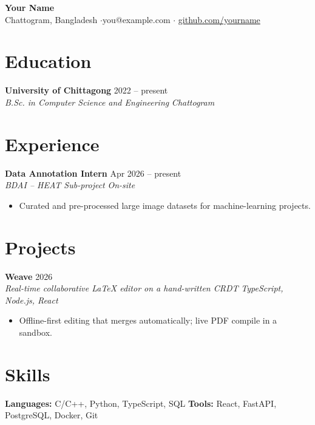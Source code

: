 \documentclass[10.5pt,a4paper]{article}
\newcommand{\entry}[4]{\textbf{#1} \hfill #2 \\ \textit{#3} \hfill \textit{#4}\\[-2pt]}
\begin{document}
\begin{center}
  {\LARGE\bfseries Your Name}\\[4pt]
  Chattogram, Bangladesh \quad$\cdot$\quad you@example.com \quad$\cdot$\quad
  \href{https://github.com/yourname}{github.com/yourname}
\end{center}

\section{Education}
\entry{University of Chittagong}{2022 -- present}{B.Sc. in Computer Science and Engineering}{Chattogram}

\section{Experience}
\entry{Data Annotation Intern}{Apr 2026 -- present}{BDAI -- HEAT Sub-project}{On-site}
\begin{itemize}
  \item Curated and pre-processed large image datasets for machine-learning projects.
\end{itemize}

\section{Projects}
\entry{Weave}{2026}{Real-time collaborative LaTeX editor on a hand-written CRDT}{TypeScript, Node.js, React}
\begin{itemize}
  \item Offline-first editing that merges automatically; live PDF compile in a sandbox.
\end{itemize}

\section{Skills}
\textbf{Languages:} C/C++, Python, TypeScript, SQL \quad
\textbf{Tools:} React, FastAPI, PostgreSQL, Docker, Git
\end{document}
